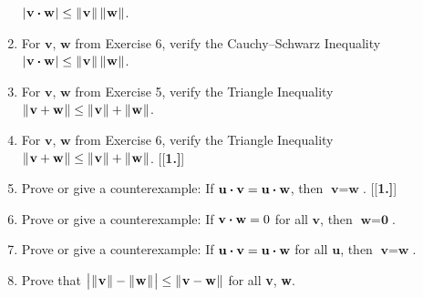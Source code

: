 \begin{enumerate}[\bfseries 1.]
  $\lvert\mspace{1mu}\textbf{v} \bm{\cdot} \textbf{w}\mspace{1mu}\rvert \le \lVert\mspace{1mu}\textbf{v}\mspace{1mu}\rVert\,\lVert\mspace{1mu}\textbf{w}\mspace{1mu}\rVert$.
 \item For $\textbf{v}$, $\textbf{w}$ from Exercise 6, verify the Cauchy--Schwarz Inequality
  $\lvert\mspace{1mu}\textbf{v} \bm{\cdot} \textbf{w}\mspace{1mu}\rvert \le \lVert\mspace{1mu}\textbf{v}\mspace{1mu}\rVert\,\lVert\mspace{1mu}\textbf{w}\mspace{1mu}\rVert$.
 \item For $\textbf{v}$, $\textbf{w}$ from Exercise 5, verify the Triangle Inequality
  $\lVert\mspace{1mu}\textbf{v} + \textbf{w}\mspace{1mu}\rVert \le \lVert\mspace{1mu}\textbf{v}\mspace{1mu}\rVert + \lVert\mspace{1mu}\textbf{w}\mspace{1mu}\rVert$.
 \item For $\textbf{v}$, $\textbf{w}$ from Exercise 6, verify the Triangle Inequality
  $\lVert\mspace{1mu}\textbf{v} + \textbf{w}\mspace{1mu}\rVert \le \lVert\mspace{1mu}\textbf{v}\mspace{1mu}\rVert + \lVert\mspace{1mu}\textbf{w}\mspace{1mu}\rVert$.
\smallskip
{}[{[\bfseries 1.]}]
 \item Prove or give a counterexample: If $\textbf{u} \bm{\cdot} \textbf{v} = \textbf{u} \bm{\cdot} \textbf{w}$,
  then $\textbf{v} =\textbf{w}$.
[{[\bfseries 1.]}]
 \item Prove or give a counterexample: If $\textbf{v} \bm{\cdot} \textbf{w} = 0$ for all $\textbf{v}$, then
  $\textbf{w} =\textbf{0}$.
 \item Prove or give a counterexample: If $\textbf{u} \bm{\cdot} \textbf{v} = \textbf{u} \bm{\cdot} \textbf{w}$
  for all $\textbf{u}$, then $\textbf{v} =\textbf{w}$.
 \item Prove that $\bigl\lvert\mspace{1mu}\lVert\mspace{1mu}\textbf{v}\mspace{1mu}\rVert - \lVert\mspace{1mu}\textbf{w}\mspace{1mu}\rVert\mspace{1mu}\bigr\rvert \le \lVert\mspace{1mu}\textbf{v} - \textbf{w}\mspace{1mu}\rVert$ for all
  \textbf{v}, \textbf{w}.


\end{enumerate}

